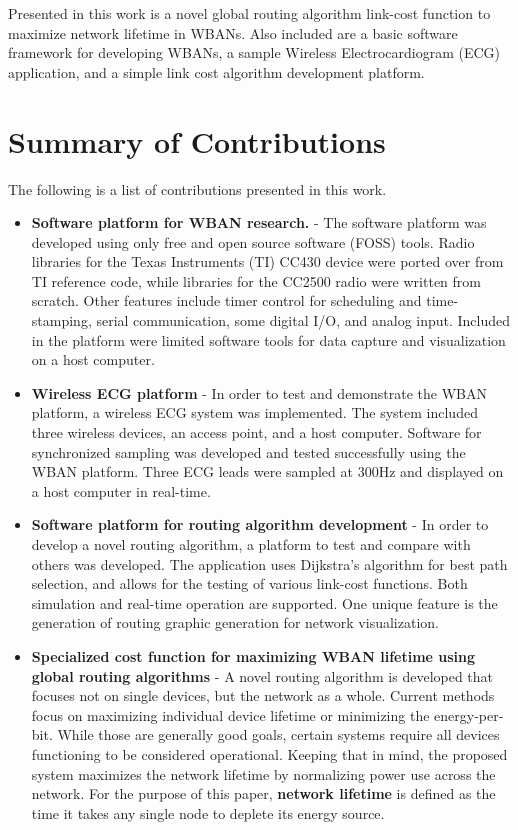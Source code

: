 \documentclass{article}
\begin{document}
Presented in this work is a novel global routing algorithm link-cost function to maximize network lifetime in WBANs. Also included are a basic software framework for developing WBANs, a sample Wireless Electrocardiogram (ECG) application, and a simple link cost algorithm development platform.

\pagebreak

\listoffigures

\pagebreak

\section*{Summary of Contributions}
The following is a list of contributions presented in this work.
\begin{itemize}
\item \textbf{Software platform for WBAN research.} - The software platform was developed using only free and open source software (FOSS) tools. Radio libraries for the Texas Instruments (TI) CC430 device were ported over from TI reference code, while libraries for the CC2500 radio were written from scratch. Other features include timer control for scheduling and time-stamping, serial communication, some digital I/O, and analog input. Included in the platform were limited software tools for data capture and visualization on a host computer.

\item \textbf{Wireless ECG platform} - In order to test and demonstrate the WBAN platform, a wireless ECG system was implemented. The system included three wireless devices, an access point, and a host computer. Software for synchronized sampling was developed and tested successfully using the WBAN platform. Three ECG leads were sampled at 300Hz and displayed on a host computer in real-time.

\item \textbf{Software platform for routing algorithm development} - In order to develop a novel routing algorithm, a platform to test and compare with others was developed. The application uses Dijkstra's algorithm for best path selection, and allows for the testing of various link-cost functions. Both simulation and real-time operation are supported. One unique feature is the generation of routing graphic generation for network visualization.

\item \textbf{Specialized cost function for maximizing WBAN lifetime using global routing algorithms} - A novel routing algorithm is developed that focuses not on single devices, but the network as a whole. Current methods focus on maximizing individual device lifetime or minimizing the energy-per-bit. While those are generally good goals, certain systems require all devices functioning to be considered operational. Keeping that in mind, the proposed system maximizes the network lifetime by normalizing power use across the network. For the purpose of this paper, \textbf{network lifetime} is defined as the time it takes any single node to deplete its energy source. 


\end{itemize}
\end{document}
